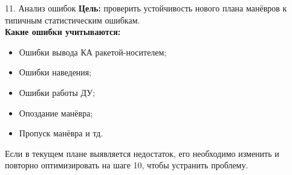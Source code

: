 \documentclass[8pt]{beamer}
\begin{document}
\begin{frame}{11. Анализ ошибок}
\textbf{Цель:} проверить устойчивость нового плана манёвров к типичным статистическим ошибкам. \\
\smallskip
\textbf{Какие ошибки учитываются:}
\begin{itemize}
    \item Ошибки вывода КА ракетой-носителем;
    \item Ошибки наведения;
    \item Ошибки работы ДУ;
    \item Опоздание манёвра;
    \item Пропуск манёвра и тд.
\end{itemize}
Если в текущем плане выявляется недостаток, его необходимо изменить и повторно оптимизировать на шаге 10, чтобы устранить проблему.
\end{frame}
\end{document}
